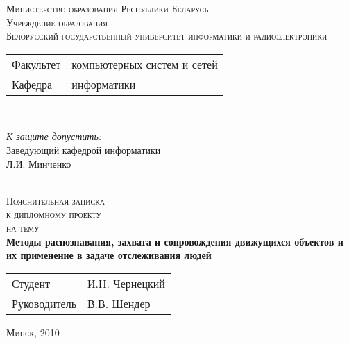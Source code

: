 \begin{titlepage}
  \begin{center}
    \textsc{\small Министерство образования Республики Беларусь}\\[0.5cm]
    \textsc{\small Учреждение образования\\\large Белорусский государственный университет информатики и радиоэлектроники}\\[0.5cm]
    \begin{minipage}{\textwidth}
      \begin{flushleft}
        \begin{tabular}{ l l }
          Факультет & компьютерных систем и сетей\\
          Кафедра   & информатики
        \end{tabular}
      \end{flushleft}
    \end{minipage}\\[0.5cm]
    \begin{minipage}{\textwidth}
      \begin{flushright}
        \textit{К защите допустить:}\\
        Заведующий кафедрой информатики\\
        \underline{\hspace*{4.5cm}} Л.И. Минченко
      \end{flushright}
    \end{minipage}\\[1.5cm]
    \textsc{\large Пояснительная записка}\\
    \textsc{\small к дипломному проекту}\\
    \textsc{\small на тему}\\[0.5cm]
    \textbf{\large Методы распознавания, захвата и сопровождения движущихся объектов и их применение в задаче отслеживания людей}\\[0.5cm]
    \begin{tabular}{ l l }
      Студент \hspace*{8cm} & И.Н. Чернецкий\\
      Руководитель & В.В. Шендер
    \end{tabular}
    \vfill
    \textsc{\small Минск, 2010}
  \end{center}
\end{titlepage}
